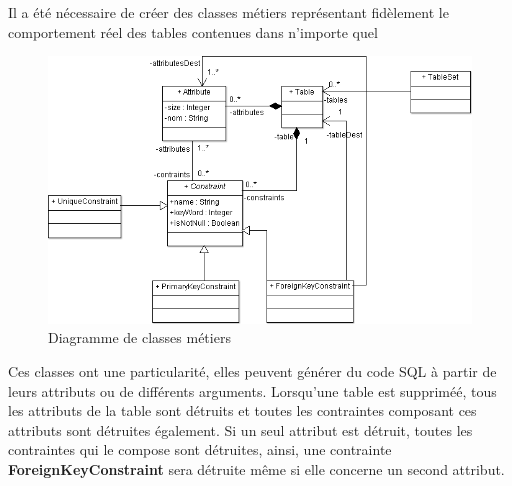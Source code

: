 Il a été nécessaire de créer des classes métiers représentant fidèlement le comportement réel des tables contenues dans n'importe quel \sgbd

\begin{figure}[H]
\includegraphics[width=15cm]{images/metier.png}
\caption{Diagramme de classes métiers}
\label{classes_metiers}
\end{figure}


Ces classes ont une particularité, elles peuvent générer du code SQL à partir de leurs attributs ou de différents arguments.
Lorsqu'une table est suppriméé, tous les attributs de la table sont détruits et toutes les contraintes composant ces attributs sont détruites également.
Si un seul attribut est détruit, toutes les contraintes qui le compose sont détruites, ainsi, une contrainte \textbf{ForeignKeyConstraint} sera détruite même si elle concerne un second attribut.
